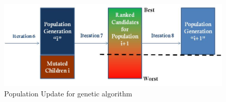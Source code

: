 \documentclass[preprint,12pt]{elsarticle}
\begin{document}
\begin{figure}[h]
\begin{center}
\includegraphics[scale=0.7]{Images/Drawing1.jpg}
\caption{Population Update for genetic algorithm}
\end{center}
\label{Fig2}
\end{figure}
\end{document}
